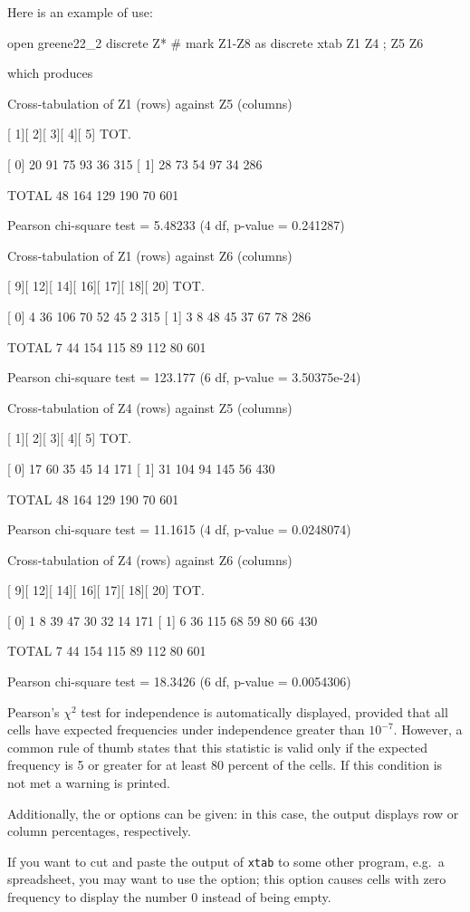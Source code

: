 Here is an example of use:
%
\begin{code}
open greene22_2
discrete Z* # mark Z1-Z8 as discrete
xtab Z1 Z4 ; Z5 Z6
\end{code}
which produces
\begin{code}
Cross-tabulation of Z1 (rows) against Z5 (columns)

       [   1][   2][   3][   4][   5]  TOT.
  
[   0]    20    91    75    93    36    315
[   1]    28    73    54    97    34    286

TOTAL     48   164   129   190    70    601

Pearson chi-square test = 5.48233 (4 df, p-value = 0.241287)

Cross-tabulation of Z1 (rows) against Z6 (columns)

       [   9][  12][  14][  16][  17][  18][  20]  TOT.
  
[   0]     4    36   106    70    52    45     2    315
[   1]     3     8    48    45    37    67    78    286

TOTAL      7    44   154   115    89   112    80    601

Pearson chi-square test = 123.177 (6 df, p-value = 3.50375e-24)

Cross-tabulation of Z4 (rows) against Z5 (columns)

       [   1][   2][   3][   4][   5]  TOT.
  
[   0]    17    60    35    45    14    171
[   1]    31   104    94   145    56    430

TOTAL     48   164   129   190    70    601

Pearson chi-square test = 11.1615 (4 df, p-value = 0.0248074)

Cross-tabulation of Z4 (rows) against Z6 (columns)

       [   9][  12][  14][  16][  17][  18][  20]  TOT.
  
[   0]     1     8    39    47    30    32    14    171
[   1]     6    36   115    68    59    80    66    430

TOTAL      7    44   154   115    89   112    80    601

Pearson chi-square test = 18.3426 (6 df, p-value = 0.0054306)
\end{code}

Pearson's $\chi^2$ test for independence is automatically displayed,
provided that all cells have expected frequencies under independence
greater than $10^{-7}$.  However, a common rule of thumb states that
this statistic is valid only if the expected frequency is 5 or
greater for at least 80 percent of the cells.  If this condition is not
met a warning is printed.

Additionally, the  or  options can be
given: in this case, the output displays row or column percentages,
respectively.

If you want to cut and paste the output of \texttt{xtab} to some other
program, e.g.\ a spreadsheet, you may want to use the 
option; this option causes cells with zero frequency to display the
number 0 instead of being empty.

